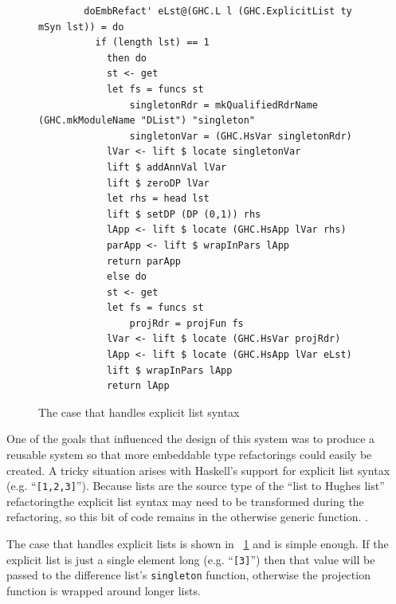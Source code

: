 \begin{figure}[t]
\begin{lstlisting}
        doEmbRefact' eLst@(GHC.L l (GHC.ExplicitList ty mSyn lst)) = do
          if (length lst) == 1
            then do
            st <- get
            let fs = funcs st
                singletonRdr = mkQualifiedRdrName (GHC.mkModuleName "DList") "singleton"
                singletonVar = (GHC.HsVar singletonRdr)
            lVar <- lift $ locate singletonVar
            lift $ addAnnVal lVar
            lift $ zeroDP lVar
            let rhs = head lst
            lift $ setDP (DP (0,1)) rhs
            lApp <- lift $ locate (GHC.HsApp lVar rhs)
            parApp <- lift $ wrapInPars lApp
            return parApp
            else do
            st <- get
            let fs = funcs st
                projRdr = projFun fs
            lVar <- lift $ locate (GHC.HsVar projRdr)
            lApp <- lift $ locate (GHC.HsApp lVar eLst)
            lift $ wrapInPars lApp
            return lApp
\end{lstlisting}
\caption{The case that handles explicit list syntax}
\label{embRefactExpLst}
\end{figure}

One of the goals that influenced the design of this system was to produce a reusable system so that more embeddable type refactorings could easily be created. A tricky situation arises with Haskell's support for explicit list syntax (e.g. ``\texttt{[1,2,3]}''). Because lists are the source type of the ``list to Hughes list'' refactoring\DIFaddbegin \DIFadd{, }\DIFaddend the explicit list syntax may need to be transformed during the refactoring, so this \DIFdelbegin {}\DIFdelend \DIFaddbegin {}\DIFaddend bit of code remains in the otherwise generic function. \DIFdelbegin {}\DIFdelend \DIFaddbegin {}\DIFaddend .

The case that handles explicit lists is shown in \DIFdelbegin {}\DIFdelend \DIFaddbegin {}\DIFaddend ~\ref{embRefactExpLst} and is simple enough. If the explicit list is just a single element long (e.g. ``\texttt{[3]}'') then that value will be passed to the difference list's \texttt{singleton} function, otherwise the projection function is wrapped around longer lists. 

